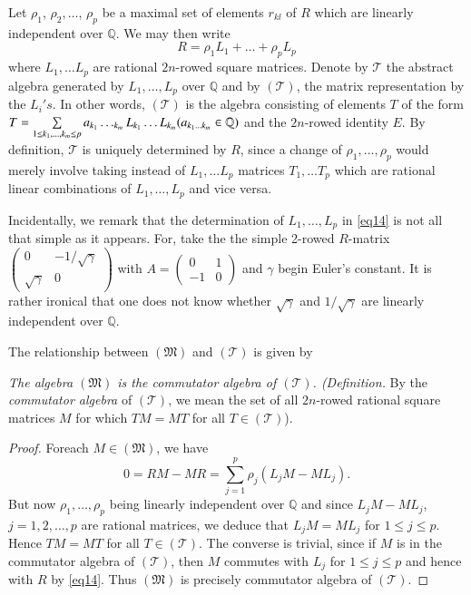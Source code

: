 \begin{remarks*}
Let $\rho_1$, $\rho_2,\ldots$, $\rho_p$ be a maximal set of elements
$r_{kl}$ of $R$ which are linearly independent over $\mathbb{Q}$. We
may then write 
\begin{equation*}
R = \rho_1 L_1 + \ldots +\rho_p L_p \tag{14}\label{eq14}
\end{equation*}
where $L_1,\ldots L_p$ are rational $2n$-rowed square
matrices. Denote by $\mathscr{T}$ the abstract algebra generated by
$L_1,\ldots, L_p$ over $\mathbb{Q}$ and by $\mathscr{(T)}$, the matrix
representation by the $L_i's$. In other words, $\mathscr{(T)}$ is the algebra
consisting of elements $T$ of the form $T = \sum\limits_{1\leq
  k_1,\ldots, k_m\leq p} a_{k_1} \ldots_{k_m}
L_{k_1}\ldots L_{k_m} (a_{k_1\ldots k_m}\break\in \mathbb{Q})$ and the
$2n$-rowed identity $E$. By definition, $\mathscr{T}$ is uniquely determined by
$R$, since a change of $\rho_1,\ldots, \rho_p$ would merely involve
taking instead of $L_1,\ldots L_p$ matrices $T_1,\ldots T_p$
which are rational linear combinations of $L_1,\ldots, L_p$ and vice
versa.

Incidentally, we remark that the determination of $L_1,\ldots, L_p$ in
\eqref{eq14} is not all that simple as it appears. For, take the the simple
2-rowed $R$-matrix $\left(\begin{smallmatrix} 0 & -1/\sqrt{\gamma}
  \\ \sqrt{\gamma} & 0 \end{smallmatrix} \right)$ with $A =
\left(\begin{smallmatrix} 0 & 1 \\ -1 & 0 \end{smallmatrix} \right)$
and $\gamma$ begin Euler's constant. It is rather ironical that one
does not know whether $\sqrt{\gamma}$ and $1/\sqrt{\gamma}$ are
linearly independent over $\mathbb{Q}$.

The relationship between $(\mathfrak{M})$ and $\mathscr{(T)}$ is given by 
\end{remarks*}

\begin{proposition}
{\em The algebra $(\mathfrak{M})$ is the commutator algebra of
$\mathscr{(T)}$. (Definition.} By the {\em commutator algebra} of
$\mathscr{(T)}$, we mean the set of all $2n$-rowed rational square
matrices $M$ for which $TM=MT$ for all $T\in \mathscr{(T)}$).
\end{proposition}

\begin{proof}
For\pageoriginale each $M \in (\mathfrak{M})$, we have
$$
0 = R M - MR = \sum^p_{j=1} \rho_j (L_j M-ML_j).
$$
But now $\rho_1,\ldots,\rho_p$ being linearly independent over
$\mathbb{Q}$ and since $L_j M - M L_j$, $j=1,2,\ldots,p$ are rational
matrices, we deduce that $L_jM= M L_j$ for $1\leq j \leq p$. Hence
$TM=MT$ for all $T\in\mathscr{(T)}$. The converse is trivial, since if $M$ is
in the commutator algebra of $\mathscr{(T)}$, then $M$ commutes with $L_j$ for
$1 \leq j \leq p$ and hence with $R$ by \eqref{eq14}. Thus $(\mathfrak{M})$ is
precisely commutator algebra of $\mathscr{(T)}$.
\end{proof}

